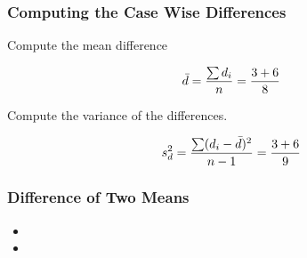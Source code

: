 

\begin{frame}
\frametitle{Computing the Case Wise Differences}
Compute the mean difference

\[ \bar{d}  = {\sum{d_i} \over n } = { 3+6 \over 8} \]

Compute the variance of the differences.

\[ s^2_{d}  ={\sum(d_i -\bar{d})^2 \over n-1 } =  { 3+6 \over 9} \]

\end{frame}


\begin{frame}
\frametitle{Difference of Two Means}
\begin{itemize}
\item
\item
\end{itemize}
\end{frame}

